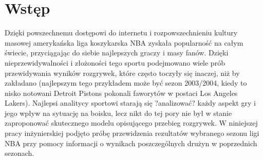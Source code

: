 \documentclass[inzynierska]{pwr_wmat_praca_dyplomowa}
\theoremstyle{plain}
\numberwithin{theorem}{chapter}
\theoremstyle{definition}
\numberwithin{theorem}{chapter}
\begin{document}
\frontmatter
\maketitle
\mainmatter
\tableofcontents

{\backmatter \chapter{Wstęp}}
Dzięki powszechnemu dostępowi do internetu i rozpowszechnieniu kultury masowej amerykańska liga koszykarska NBA zyskała popularność na całym świecie, przyciągając do siebie najlepszych graczy i masy fanów. Dzięki nieprzewidywalności i złożoności tego sportu podejmowano wiele prób przewidywania wyników rozgrywek, które często toczyły się inaczej, niż by zakładano (najlepszym tego przykładem może być sezon 2003/2004, kiedy to nisko notowani Detroit Pistons pokonali faworytów w postaci Los Angeles Lakers). Najlepsi analitycy sportowi starają się ?analizować? każdy aspekt gry i jego wpływ na sytuację na boisku, lecz nikt do tej pory nie był w stanie zaproponować skutecznego modelu opisującego przebieg rozgrywek. 
W niniejszej pracy inżynierskiej podjęto próbę przewidzenia rezultatów wybranego sezonu ligi NBA przy pomocy informacji o wynikach poszczególnych drużyn w poprzednich sezonach. 
\end{document}
